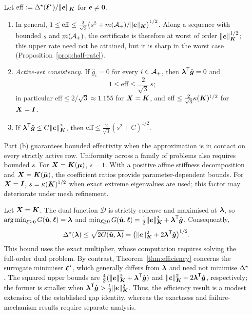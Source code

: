 \begin{corollary}[effectivity]\label{cor:effectivity}
Let $\mathrm{eff}:=\Delta^{\star}(\boldsymbol{\ell}^{\star})/\lVert \boldsymbol{e} \rVert_{\boldsymbol{K}}$ for $\boldsymbol{e}\ne\boldsymbol 0$.
\begin{enumerate}
\item[(a)] In general, $1\le\mathrm{eff}\le\frac{2}{\sqrt3}\big(s^2+m(\mathcal{A}_{+})/\lVert \boldsymbol{e} \rVert_{\boldsymbol{K}}\big)^{1/2}$. Along a sequence with bounded $s$ and $m(\mathcal{A}_{+})$,
the certificate is therefore at worst of order $\lVert \boldsymbol{e} \rVert_{\boldsymbol{K}}^{1/2}$; this upper rate need not be attained, but it is sharp in the
worst case (Proposition~\ref{prop:half-rate}).
\item[(b)] \emph{Active-set consistency.} If $\hat g_i=0$ for every $i\in\mathcal{A}_{+}$, then $\boldsymbol{\lambda}^{\mathsf{T}}\hat{\boldsymbol{g}}=0$ and
\begin{equation}\label{eq:eff-consistent}
  1\le\mathrm{eff}\le\frac{2}{\sqrt3}\,s ;
\end{equation}
in particular $\mathrm{eff}\le2/\sqrt3\approx1.155$ for $\boldsymbol{X}=\boldsymbol{K}$, and $\mathrm{eff}\le\frac{2}{\sqrt3}\kappa(\boldsymbol{K})^{1/2}$ for $\boldsymbol{X}=\boldsymbol{I}$.
\item[(c)] If $\boldsymbol{\lambda}^{\mathsf{T}}\hat{\boldsymbol{g}}\le C\lVert \boldsymbol{e} \rVert_{\boldsymbol{K}}^2$, then $\mathrm{eff}\le\frac{2}{\sqrt3}(s^2+C)^{1/2}$.
\end{enumerate}
\end{corollary}

Part (b) guarantees bounded effectivity when the approximation is in contact on every strictly active row. Uniformity across a family of problems
also requires bounded $s$. For $\boldsymbol{X}=\boldsymbol{K}(\boldsymbol{\mu})$, $s=1$. With a positive affine stiffness decomposition and $\boldsymbol{X}=\boldsymbol{K}(\bar{\boldsymbol{\mu}})$, the
coefficient ratios provide parameter-dependent bounds. For $\boldsymbol{X}=\boldsymbol{I}$, $s=\kappa(\boldsymbol{K})^{1/2}$ when exact extreme eigenvalues are used; this
factor may deteriorate under mesh refinement.

\begin{remark}\label{rem:gap-comparison}
Let $\boldsymbol{X}=\boldsymbol{K}$. The dual function $\mathcal D$ is strictly concave and maximised at $\boldsymbol{\lambda}$, so
$\operatorname{arg\,min}_{\boldsymbol{\ell}\ge0}G(\hat{\boldsymbol{u}},\boldsymbol{\ell})=\boldsymbol{\lambda}$ and
$\min_{\boldsymbol{\ell}\ge0}G(\hat{\boldsymbol{u}},\boldsymbol{\ell})=\frac12\lVert \boldsymbol{e} \rVert_{\boldsymbol{K}}^2+\boldsymbol{\lambda}^{\mathsf{T}}\hat{\boldsymbol{g}}$. Consequently,
\[
  \Delta^{\star}(\boldsymbol{\lambda})\le\sqrt{2G(\hat{\boldsymbol{u}},\boldsymbol{\lambda})}
  =\big(\lVert \boldsymbol{e} \rVert_{\boldsymbol{K}}^2+2\boldsymbol{\lambda}^{\mathsf{T}}\hat{\boldsymbol{g}}\big)^{1/2}.
\]
This bound uses the exact multiplier, whose computation requires solving the full-order dual problem. By contrast,
Theorem~\ref{thm:efficiency} concerns the surrogate minimiser $\boldsymbol{\ell}^{\star}$, which generally differs from $\boldsymbol{\lambda}$ and need not minimise $\Delta^{\star}$.
The squared upper bounds are $\frac43(\lVert \boldsymbol{e} \rVert_{\boldsymbol{K}}^2+\boldsymbol{\lambda}^{\mathsf{T}}\hat{\boldsymbol{g}})$ and
$\lVert \boldsymbol{e} \rVert_{\boldsymbol{K}}^2+2\boldsymbol{\lambda}^{\mathsf{T}}\hat{\boldsymbol{g}}$, respectively; the former is smaller when
$\boldsymbol{\lambda}^{\mathsf{T}}\hat{\boldsymbol{g}}>\frac12\lVert \boldsymbol{e} \rVert_{\boldsymbol{K}}^2$. Thus, the efficiency result is a modest extension of the established gap identity, whereas the exactness and
failure-mechanism results require separate analysis.
\end{remark}

